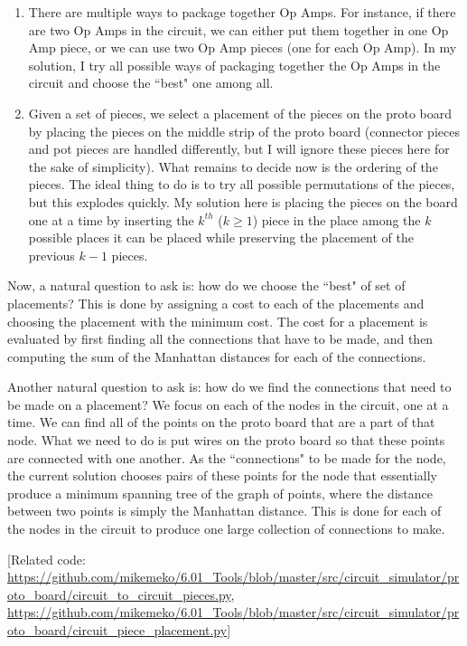 \documentclass[12pt]{amsart}
\begin{document}
\begin{enumerate}
\item There are multiple ways to package together Op Amps. For instance, if there are two Op Amps in the circuit, we can either put them together in one Op Amp piece, or we can use two Op Amp pieces (one for each Op Amp). In my solution, I try all possible ways of packaging together the Op Amps in the circuit and choose the ``best" one among all.
\item Given a set of pieces, we select a placement of the pieces on the proto board by placing the pieces on the middle strip of the proto board (connector pieces and pot pieces are handled differently, but I will ignore these pieces here for the sake of simplicity). What remains to decide now is the ordering of the pieces. The ideal thing to do is to try all possible permutations of the pieces, but this explodes quickly. My solution here is placing the pieces on the board one at a time by inserting the $k^{th}$ ($k \ge 1$) piece in the place among the $k$ possible places it can be placed while preserving the placement of the previous $k - 1$ pieces.
\end{enumerate}

Now, a natural question to ask is: how do we choose the ``best" of  set of placements? This is done by assigning a cost to each of the placements and choosing the placement with the minimum cost. The cost for a placement is evaluated by first finding all the connections that have to be made, and then computing the sum of the Manhattan distances for each of the connections.

Another natural question to ask is: how do we find the connections that need to be made on a placement? We focus on each of the nodes in the circuit, one at a time. We can find all of the points on the proto board that are a part of that node. What we need to do is put wires on the proto board so that these points are connected with one another. As the ``connections" to be made for the node, the current solution chooses pairs of these points for the node that essentially produce a minimum spanning tree of the graph of points, where the distance between two points is simply the Manhattan distance. This is done for each of the nodes in the circuit to produce one large collection of connections to make.

[Related code: \url{https://github.com/mikemeko/6.01_Tools/blob/master/src/circuit_simulator/proto_board/circuit_to_circuit_pieces.py}, \url{https://github.com/mikemeko/6.01_Tools/blob/master/src/circuit_simulator/proto_board/circuit_piece_placement.py}]
\end{document}
